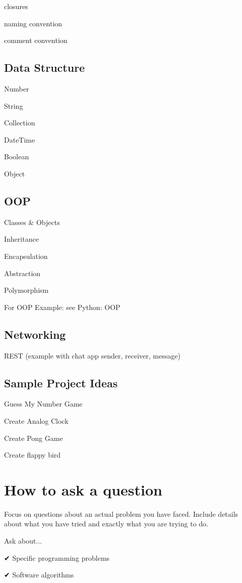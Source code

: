 closures

naming convention

comment convention

\subsection{Data Structure}

Number

String

Collection

DateTime

Boolean

Object

\subsection{OOP}

Classes & Objects

Inheritance

Encapsulation

Abstraction

Polymorphism

For OOP Example: see Python: OOP

\subsection{Networking}

REST (example with chat app sender, receiver, message)

\subsection{Sample Project Ideas}

Guess My Number Game

Create Analog Clock

Create Pong Game

Create flappy bird

\section{How to ask a question}

Focus on questions about an actual problem you have faced. Include details about what you have tried and exactly what you are trying to do.

Ask about...

✔ Specific programming problems

✔ Software algorithms

